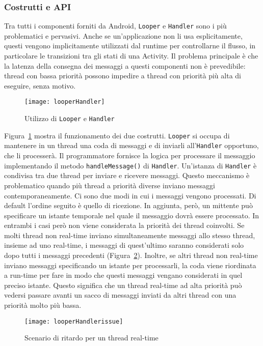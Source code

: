 \subsubsection{Costrutti e API}
Tra tutti i componenti forniti da Android, \texttt{Looper} e \texttt{Handler} sono i più problematici e pervasivi. Anche se un'applicazione non li usa esplicitamente, questi vengono implicitamente utilizzati dal runtime per controllarne il flusso, in particolare le transizioni tra gli stati di una Activity. Il problema principale è che la latenza della consegna dei messaggi a questi componenti non è prevedibile: thread con bassa priorità possono impedire a thread con priorità più alta di eseguire, senza motivo. 

\begin{figure}[h]
	\centering
	\texttt{[image: looperHandler]}
	\caption{Utilizzo di \texttt{Looper} e \texttt{Handler}}
	\label{fig:looperhandler}
\end{figure}
Figura~\ref{fig:looperhandler} mostra il funzionamento dei due costrutti. \texttt{Looper} si occupa di mantenere in un thread una coda di messaggi e di inviarli all'\texttt{Handler} opportuno, che li processerà. Il programmatore fornisce la logica per processare il messaggio implementando il metodo \texttt{handleMessage()} di \texttt{Handler}. Un'istanza di \texttt{Handler} è condivisa tra due thread per inviare e ricevere messaggi. Questo meccanismo è problematico quando più thread a priorità diverse inviano messaggi contemporaneamente. Ci sono due modi in cui i messaggi vengono processati. Di default l'ordine seguito è quello di ricezione. In aggiunta, però, un mittente può specificare un istante temporale nel quale il messaggio dovrà essere processato. In entrambi i casi però non viene considerata la priorità dei thread coinvolti. Se molti thread non real-time inviano simultaneamente messaggi allo stesso thread, insieme ad uno real-time, i messaggi di quest'ultimo saranno considerati solo dopo tutti i messaggi precedenti (Figura~\ref{fig:looperhandlerissue}). Inoltre, se altri thread non real-time inviano messaggi specificando un istante per processarli, la coda viene riordinata a run-time per fare in modo che questi messaggi vengano considerati in quel preciso istante. Questo significa che un thread real-time ad alta priorità può vedersi passare avanti un sacco di messaggi inviati da altri thread con una priorità molto più bassa.
\begin{figure}
	\centering
	\texttt{[image: looperHandlerissue]}
	\caption{Scenario di ritardo per un thread real-time}
	\label{fig:looperhandlerissue}
\end{figure}

